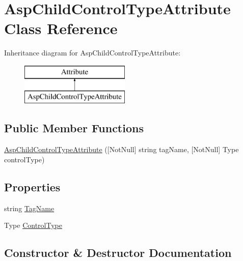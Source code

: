 \hypertarget{class_asp_child_control_type_attribute}{}\section{Asp\+Child\+Control\+Type\+Attribute Class Reference}
\label{class_asp_child_control_type_attribute}
Inheritance diagram for Asp\+Child\+Control\+Type\+Attribute\+:\begin{figure}[H]
\begin{center}
\leavevmode
\includegraphics[height=2.000000cm]{class_asp_child_control_type_attribute}
\end{center}
\end{figure}
\subsection*{Public Member Functions}
\begin{DoxyCompactItemize}
\item 
\mbox{\hyperlink{class_asp_child_control_type_attribute_af7a9eb0a750c38f545699ab8f6a86098}{Asp\+Child\+Control\+Type\+Attribute}} (\mbox{[}Not\+Null\mbox{]} string tag\+Name, \mbox{[}Not\+Null\mbox{]} Type control\+Type)
\end{DoxyCompactItemize}
\subsection*{Properties}
\begin{DoxyCompactItemize}
\item 
string \mbox{\hyperlink{class_asp_child_control_type_attribute_a9e30613d70a3bcffb32a4664a5d121d2}{Tag\+Name}}
\item 
Type \mbox{\hyperlink{class_asp_child_control_type_attribute_a6c6421f394baa882056b2dfc3efcd284}{Control\+Type}}
\end{DoxyCompactItemize}


\subsection{Constructor \& Destructor Documentation}
\mbox{\label{class_asp_child_control_type_attribute_af7a9eb0a750c38f545699ab8f6a86098}} 
